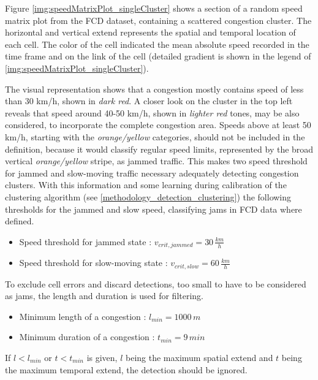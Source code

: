
Figure \ref{img:speedMatrixPlot_singleCluster} shows a section of a random speed matrix plot from the FCD dataset, containing a scattered congestion cluster. The horizontal and vertical extend represents the spatial and temporal location of each cell. The color of the cell indicated the mean absolute speed recorded in the time frame and on the link of the cell (detailed gradient is shown in the legend of \cref{img:speedMatrixPlot_singleCluster}).

The visual representation shows that a congestion mostly contains speed of less than 30 km/h, shown in \textit{dark red}. A closer look on the cluster in the top left reveals that speed around 40-50 km/h, shown in \textit{lighter red} tones, may be also considered, to incorporate the complete congestion area. Speeds above at least 50 km/h, starting with the \textit{orange/yellow} categories, should not be included in the definition, because it would classify regular speed limits, represented by the broad vertical \textit{orange/yellow} stripe, as jammed traffic. This makes two speed threshold for jammed and slow-moving traffic necessary adequately detecting congestion clusters. With this information and some learning during calibration of the clustering algorithm (see \cref{methodology_detection_clustering}) the following thresholds for the jammed and slow speed, classifying \glspl{jam} in FCD data where defined.

\begin{itemize}
	\item Speed threshold for jammed state : $v_{crit,jammed} = 30\,\frac{km}{h}$
	\item Speed threshold for slow-moving state : $v_{crit,slow} = 60\,\frac{km}{h}$
\end{itemize}

To exclude cell errors and discard detections, too small to have to be considered as jams, the length and duration is used for filtering. 

\begin{itemize}
	\item Minimum length of a congestion : $l_{min} = 1000\,m$
	\item Minimum duration of a congestion : $t_{min} = 9\,min$
\end{itemize}

If $l < l_{min}$ or $t < t_{min}$ is given, $l$ being the maximum spatial extend and $t$ being the maximum temporal extend, the detection should be ignored.
